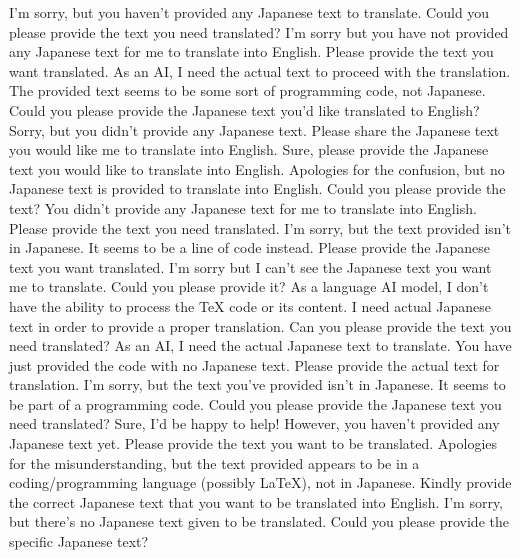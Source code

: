 {%
I'm sorry, but you haven't provided any Japanese text to translate. Could you please provide the text you need translated?
I'm sorry but you have not provided any Japanese text for me to translate into English. Please provide the text you want translated.
As an AI, I need the actual text to proceed with the translation. The provided text seems to be some sort of programming code, not Japanese. Could you please provide the Japanese text you'd like translated to English?
Sorry, but you didn't provide any Japanese text. Please share the Japanese text you would like me to translate into English.
Sure, please provide the Japanese text you would like to translate into English.
Apologies for the confusion, but no Japanese text is provided to translate into English. Could you please provide the text?
You didn't provide any Japanese text for me to translate into English. Please provide the text you need translated.
I'm sorry, but the text provided isn't in Japanese. It seems to be a line of code instead. Please provide the Japanese text you want translated.
I'm sorry but I can't see the Japanese text you want me to translate. Could you please provide it?
As a language AI model, I don't have the ability to process the TeX code or its content. I need actual Japanese text in order to provide a proper translation. Can you please provide the text you need translated?
As an AI, I need the actual Japanese text to translate. You have just provided the code with no Japanese text. Please provide the actual text for translation.
I'm sorry, but the text you've provided isn't in Japanese. It seems to be part of a programming code. Could you please provide the Japanese text you need translated?
Sure, I'd be happy to help! However, you haven't provided any Japanese text yet. Please provide the text you want to be translated.
Apologies for the misunderstanding, but the text provided appears to be in a coding/programming language (possibly LaTeX), not in Japanese. Kindly provide the correct Japanese text that you want to be translated into English.
I'm sorry, but there's no Japanese text given to be translated. Could you please provide the specific Japanese text?
}

